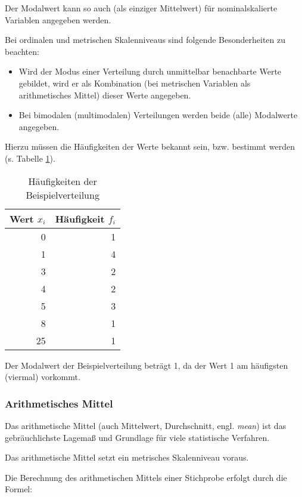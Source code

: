 \documentclass[
  ngerman,
]{article}
\providecommand{\tightlist}{%
  \setlength{\itemsep}{0pt}\setlength{\parskip}{0pt}}
\begin{document}
Der Modalwert kann so auch (als einziger Mittelwert) für nominalskalierte Variablen angegeben werden.

Bei ordinalen und metrischen Skalenniveaus sind folgende Besonderheiten zu beachten:

\begin{itemize}
\tightlist
\item
  Wird der Modus einer Verteilung durch unmittelbar benachbarte Werte gebildet, wird er als Kombination (bei metrischen Variablen als arithmetisches Mittel) dieser Werte angegeben.
\item
  Bei bimodalen (multimodalen) Verteilungen werden beide (alle) Modalwerte angegeben.
\end{itemize}

Hierzu müssen die Häufigkeiten der Werte bekannt sein, bzw. bestimmt werden (s. Tabelle \ref{tab:mod}).

\begin{table}[H]

\caption{\label{tab:mod}Häufigkeiten der Beispielverteilung}
\centering
\begin{tabular}[t]{rr}
\toprule
Wert $x_i$ & Häufigkeit $f_i$\\
\midrule
0 & 1\\
1 & 4\\
3 & 2\\
4 & 2\\
5 & 3\\
8 & 1\\
25 & 1\\
\bottomrule
\end{tabular}
\end{table}

Der Modalwert der Beispielverteilung beträgt 1, da der Wert 1 am häufigsten (viermal) vorkommt.

\hypertarget{arithmetisches-mittel}{%
\subsubsection{Arithmetisches Mittel}\label{arithmetisches-mittel}}

Das arithmetische Mittel (auch Mittelwert, Durchschnitt, engl. \emph{mean}) ist das gebräuchlichste Lagemaß und Grundlage für viele statistische Verfahren.

Das arithmetische Mittel setzt ein metrisches Skalenniveau voraus.

Die Berechnung des arithmetischen Mittels einer Stichprobe erfolgt durch die Formel:
\end{document}
